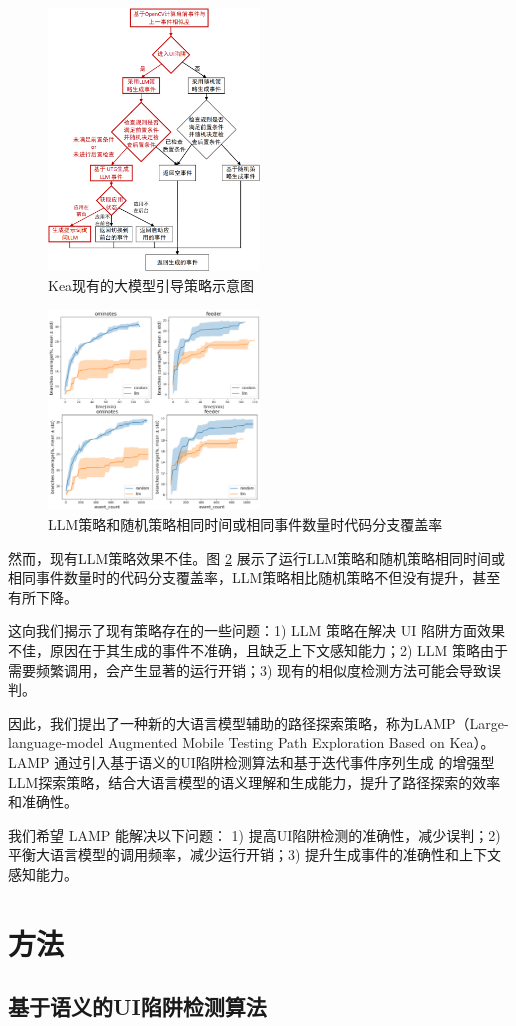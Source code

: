 \documentclass[twocolumn]{article}
\begin{document}
\begin{figure}
    \centering
    \includegraphics[width=0.5\textwidth]{img/llm.png}
    \caption{Kea现有的大模型引导策略示意图}
    \label{fig:llm}
\end{figure}

\begin{figure}
    \centering
    \includegraphics[width=0.5\textwidth]{img/llm_test.png}
    \caption{LLM策略和随机策略相同时间或相同事件数量时代码分支覆盖率}
    \label{fig:llm_test}
\end{figure}

然而，现有LLM策略效果不佳。图 \ref{fig:llm_test} 展示了运行LLM策略和随机策略相同时间或相同事件数量时的代码分支覆盖率，LLM策略相比随机策略不但没有提升，甚至有所下降。

这向我们揭示了现有策略存在的一些问题：1) LLM 策略在解决 UI 陷阱方面效果不佳，原因在于其生成的事件不准确，且缺乏上下文感知能力；2) LLM 策略由于需要频繁调用，会产生显著的运行开销；3) 现有的相似度检测方法可能会导致误判。

因此，我们提出了一种新的大语言模型辅助的路径探索策略，称为LAMP（Large-language-model Augmented Mobile Testing Path Exploration Based on Kea）。LAMP 通过引入基于语义的UI陷阱检测算法和基于迭代事件序列生成 的增强型LLM探索策略，结合大语言模型的语义理解和生成能力，提升了路径探索的效率和准确性。

我们希望 LAMP 能解决以下问题：
1) 提高UI陷阱检测的准确性，减少误判；2) 平衡大语言模型的调用频率，减少运行开销；3) 提升生成事件的准确性和上下文感知能力。

\section{方法}

\subsection{基于语义的UI陷阱检测算法}




\end{document}
